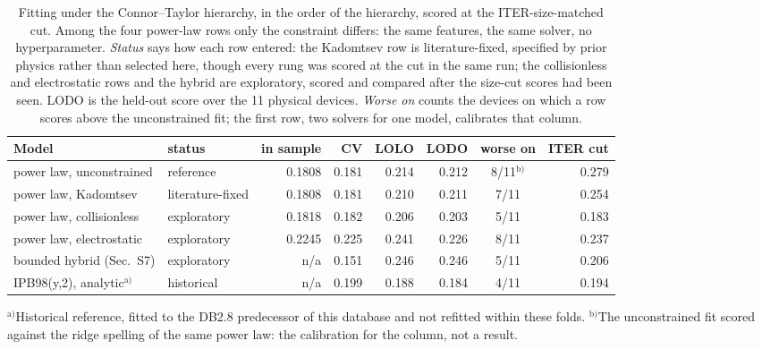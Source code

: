 \documentclass[aip,pop,preprint,amsmath,amssymb]{revtex4-2}
\begin{document}
\begin{table}[t]
\caption{Fitting under the Connor--Taylor hierarchy, in the order of the
hierarchy, scored at the ITER-size-matched cut. Among the four power-law
rows only the constraint differs: the same features, the same solver, no
hyperparameter. \emph{Status} says how each row entered: the Kadomtsev row is
literature-fixed, specified by prior physics rather than selected here, though
every rung was scored at the cut in the same run; the collisionless
and electrostatic rows and the hybrid are exploratory, scored and compared
after the size-cut scores had been seen. LODO is the held-out score over the
11 physical devices. \emph{Worse on} counts the devices on which a row scores
above the unconstrained fit; the first row, two solvers for one model,
calibrates that column.}
\label{tab:dimensional}
\begin{ruledtabular}
\begin{tabular}{llrrrrcr}
Model & status & in sample & CV & LOLO & LODO & worse on & ITER cut \\
\hline
power law, unconstrained & reference & 0.1808 & 0.181 & 0.214 & 0.212 & 8/11$^{\mathrm{b)}}$ & 0.279 \\
power law, Kadomtsev & literature-fixed & 0.1808 & 0.181 & 0.210 & 0.211 & 7/11 & 0.254 \\
power law, collisionless & exploratory & 0.1818 & 0.182 & 0.206 & 0.203 & 5/11 & 0.183 \\
power law, electrostatic & exploratory & 0.2245 & 0.225 & 0.241 & 0.226 & 8/11 & 0.237 \\
bounded hybrid (Sec.~S7) & exploratory & n/a & 0.151 & 0.246 & 0.246 & 5/11 & 0.206 \\
IPB98(y,2), analytic$^{\mathrm{a)}}$ & historical & n/a & 0.199 & 0.188 & 0.184 & 4/11 & 0.194 \\
\end{tabular}
\end{ruledtabular}
{\footnotesize $^{\mathrm{a)}}$Historical reference, fitted to the DB2.8 predecessor of
this database and not refitted within these folds. $^{\mathrm{b)}}$The
unconstrained fit scored against the ridge spelling of the same power law: the
calibration for the column, not a result.}
\end{table}
\end{document}
